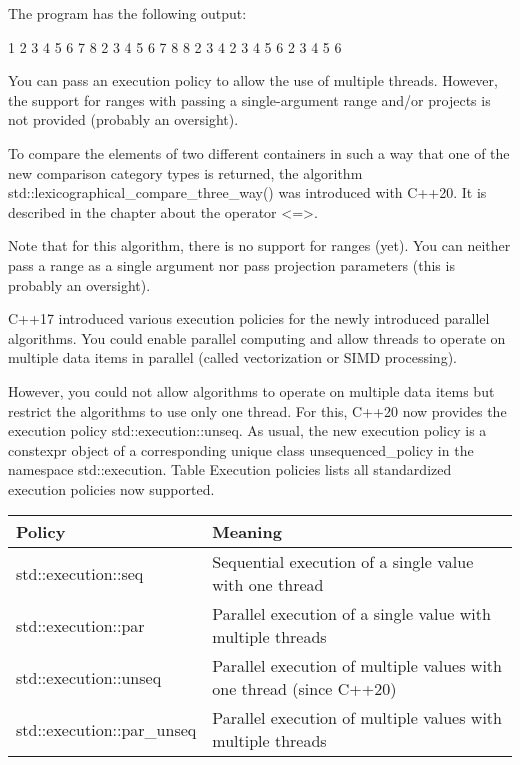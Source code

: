 The program has the following output:

\begin{shell}
1 2 3 4 5 6 7 8
2 3 4 5 6 7 8 8
2 3 4 2 3 4 5 6
2 3 4 5 6
\end{shell}

You can pass an execution policy to allow the use of multiple threads. However, the support for ranges with passing a single-argument range and/or projects is not provided (probably an oversight).


To compare the elements of two different containers in such a way that one of the new comparison category types is returned, the algorithm std::lexicographical\_compare\_three\_way() was introduced with C++20. It is described in the chapter about the operator <=>.

Note that for this algorithm, there is no support for ranges (yet). You can neither pass a range as a single argument nor pass projection parameters (this is probably an oversight).


C++17 introduced various execution policies for the newly introduced parallel algorithms. You could enable parallel computing and allow threads to operate on multiple data items in parallel (called vectorization or SIMD processing).

However, you could not allow algorithms to operate on multiple data items but restrict the algorithms to use only one thread. For this, C++20 now provides the execution policy std::execution::unseq. As usual, the new execution policy is a constexpr object of a corresponding unique class unsequenced\_policy in the namespace std::execution. Table Execution policies lists all standardized execution policies now supported.


\begin{longtable}[c]{|l|l|}
\hline
\textbf{Policy}     & \textbf{Meaning}                                           \\ \hline
\endfirsthead
%
\endhead
%
std::execution::seq & Sequential execution of a single value with one thread     \\ \hline
std::execution::par & Parallel execution of a single value with multiple threads \\ \hline
std::execution::unseq      & Parallel execution of multiple values with one thread (since C++20) \\ \hline
std::execution::par\_unseq & Parallel execution of multiple values with multiple threads         \\ \hline
\end{longtable}

